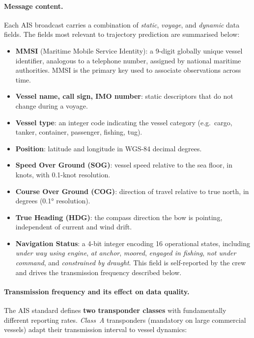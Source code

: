 \documentclass[12pt, a4paper]{article}
\begin{document}
  \paragraph{Message content.}
  Each AIS broadcast carries a combination of \textit{static}, \textit{voyage}, and
  \textit{dynamic} data fields.  The fields most relevant to trajectory prediction are
  summarised below:

  \begin{itemize}
      \item \textbf{MMSI} (Maritime Mobile Service Identity): a 9-digit globally unique
            vessel identifier, analogous to a telephone number, assigned by national maritime
            authorities.  MMSI is the primary key used to associate observations across time.
      \item \textbf{Vessel name, call sign, IMO number}: static descriptors that do not
            change during a voyage.
      \item \textbf{Vessel type}: an integer code indicating the vessel category
            (e.g.\ cargo, tanker, container, passenger, fishing, tug).
      \item \textbf{Position}: latitude and longitude in WGS-84 decimal degrees.
      \item \textbf{Speed Over Ground (SOG)}: vessel speed relative to the sea floor,
            in knots, with 0.1-knot resolution.
      \item \textbf{Course Over Ground (COG)}: direction of travel relative to true north,
            in degrees (0.1° resolution).
      \item \textbf{True Heading (HDG)}: the compass direction the bow is pointing,
            independent of current and wind drift.
      \item \textbf{Navigation Status}: a 4-bit integer encoding 16 operational states,
            including \textit{under way using engine}, \textit{at anchor}, \textit{moored},
            \textit{engaged in fishing}, \textit{not under command}, and
            \textit{constrained by draught}.  This field is self-reported by the crew and
            drives the transmission frequency described below.
  \end{itemize}

  \paragraph{Transmission frequency and its effect on data quality.}
  The AIS standard defines \textbf{two transponder classes} with fundamentally different
  reporting rates.  \textit{Class~A} transponders (mandatory on large commercial vessels)
  adapt their transmission interval to vessel dynamics:
\end{document}
